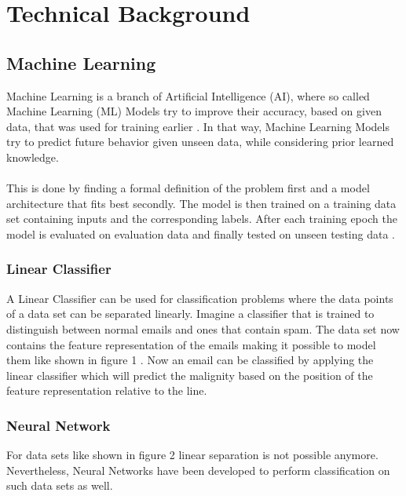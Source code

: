 
\chapter{Technical Background}
	
	\section{Machine Learning}
	
		\justifying \noindent
		Machine Learning is a branch of Artificial Intelligence (AI), where so called Machine Learning (ML) Models try to improve their accuracy, based on given data, that was used for training earlier \cite{simeone2018brief}. In that way, Machine Learning Models try to predict future behavior given unseen data, while considering prior learned knowledge.
		\\\\
		This is done by finding a formal definition of the problem first and a model architecture that fits best secondly. The model is then trained on a training data set containing inputs and the corresponding labels. After each training epoch the model is evaluated on evaluation data and finally tested on unseen testing data .
		
		\subsection{Linear Classifier}
		
			A Linear Classifier can be used for classification problems where the data points of a data set can be separated linearly. Imagine a classifier that is trained to distinguish between normal emails and ones that contain spam. The data set now contains the feature representation of the emails making it possible to model them like shown in figure 1  . Now an email can be classified by applying the linear classifier which will predict the malignity based on the position of the feature representation relative to the line.
		
		\subsection{Neural Network}
		
			For data sets like shown in figure 2   linear separation is not possible anymore. Nevertheless, Neural Networks have been developed to perform classification on such data sets as well. 

